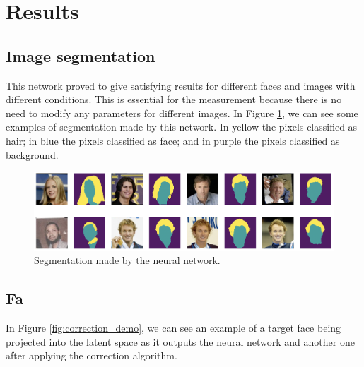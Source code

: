 \documentclass[review]{elsarticle}
\begin{document}
\section{Results}\label{section:results}

\subsection{Image segmentation}

This network proved to give satisfying results for different faces and images with different conditions. This is essential for the measurement because there is no need to modify any parameters for different images. In Figure \ref{fig:segmentation}, we can see some examples of segmentation made by this network. In yellow the pixels classified as hair; in blue the pixels classified as face; and in purple the pixels classified as background.

\begin{figure}[H]
  \includegraphics[width=\linewidth, center]{Images/segmentation.png}
  \caption{Segmentation made by the neural network.}
  \label{fig:segmentation}
\end{figure}

\subsection{Fa}

In Figure \ref{fig:correction_demo}, we can see an example of a target face being projected into the latent space as it outputs the neural network and another one after applying the correction algorithm.
\end{document}

